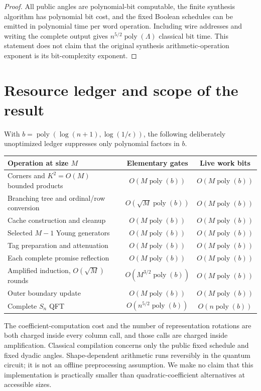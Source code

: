 \documentclass[11pt]{article}
\theoremstyle{definition}
\newcommand{\poly}{\operatorname{poly}}
\begin{document}
\begin{proof}
All public angles are polynomial-bit computable, the finite synthesis
algorithm has polynomial bit cost, and the fixed Boolean schedules can be
emitted in polynomial time per word operation. Including wire addresses
and writing the complete output gives $n^{5/2}\poly(\Lambda)$ classical
bit time. This statement does not claim that the original synthesis
arithmetic-operation exponent is its bit-complexity exponent.
\end{proof}

\section{Resource ledger and scope of the result}

With $b=\poly(\log(n+1),\log(1/\epsilon))$, the following deliberately
unoptimized ledger suppresses only polynomial factors in $b$.
\begin{center}
\begin{tabular}{lcc}
\hline
Operation at size $M$ & Elementary gates & Live work bits\\
\hline
Corners and $K^2=O(M)$ bounded products & $O(M\poly(b))$ & $O(M\poly(b))$\\
Branching tree and ordinal/row conversion & $O(\sqrt M\poly(b))$ & $O(M\poly(b))$\\
Cache construction and cleanup & $O(M\poly(b))$ & $O(M\poly(b))$\\
Selected $M-1$ Young generators & $O(M\poly(b))$ & $O(M\poly(b))$\\
Tag preparation and attenuation & $O(M\poly(b))$ & $O(M\poly(b))$\\
Each complete promise reflection & $O(M\poly(b))$ & $O(M\poly(b))$\\
Amplified induction, $O(\sqrt M)$ rounds & $O(M^{3/2}\poly(b))$ & $O(M\poly(b))$\\
Outer boundary update & $O(M\poly(b))$ & $O(M\poly(b))$\\
\hline
Complete $S_n$ QFT & $O(n^{5/2}\poly(b))$ & $O(n\poly(b))$\\
\hline
\end{tabular}
\end{center}

The coefficient-computation cost and the number of representation rotations
are both charged inside every column call, and those calls are charged
inside amplification. Classical compilation concerns only the public
fixed schedule and fixed dyadic angles. Shape-dependent arithmetic runs
reversibly in the quantum circuit; it is not an offline preprocessing
assumption. We make no claim that this implementation is practically
smaller than quadratic-coefficient alternatives at accessible sizes.
\end{document}
